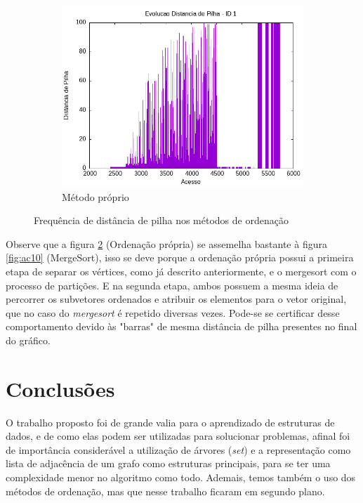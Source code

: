 \documentclass{article}
\begin{document}
\begin{figure}[H]
\begin{subfigure}[c]{0.4\textwidth}
        \centering
        \includegraphics[width=\textwidth]{./images/100-200/my_sort/registro_a-distp-1.png}
        \caption{Método próprio}
        \label{fig:a11}
    \end{subfigure}
    \hfill
    \caption{Frequência de distância de pilha nos métodos de ordenação}

\end{figure}

Observe que a figura \ref{fig:a11} (Ordenação própria) se assemelha bastante à figura \ref{fig:ac10} (MergeSort), isso se deve porque a ordenação própria possui a primeira etapa de separar os vértices, como já descrito anteriormente, e o mergesort com o processo de partições. 
E na segunda etapa, ambos possuem a mesma ideia de percorrer os subvetores ordenados e atribuir os elementos para o vetor original, que no caso do \emph{mergesort} é repetido diversas vezes. Pode-se se certificar desse comportamento devido às "barras" de mesma distância de pilha presentes no final do gráfico. 


\section{Conclusões}

O trabalho proposto foi de grande valia para o aprendizado de estruturas de dados, e de como elas podem ser utilizadas para solucionar problemas, afinal foi de importância considerável a utilização de árvores (\emph{set}) e a representação como lista de adjacência de um grafo como estruturas principais, para se ter uma complexidade menor no algoritmo como todo. Ademais, temos também o uso dos métodos de ordenação, mas que nesse trabalho ficaram em segundo plano.
\end{document}
